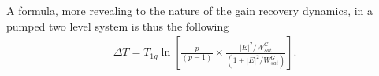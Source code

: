 \documentclass[preprint,secnumarabic,amssymb, nobibnotes, aip, prd]{revtex4-1}
\DeclareMathOperator{\sech}{sech}
\begin{document}
A formula, more revealing to the nature of the gain recovery dynamics, in a pumped two level system is thus the following
\begin{align}
\Delta T = T_{1g} \ln\left[\frac{p}{\left(p-1\right)}\times\frac{|E|^2/W_{sat}^G}{\left (1+|E|^2/W_{sat}^G\right)}\right].
\end{align}
%


\end{document}
